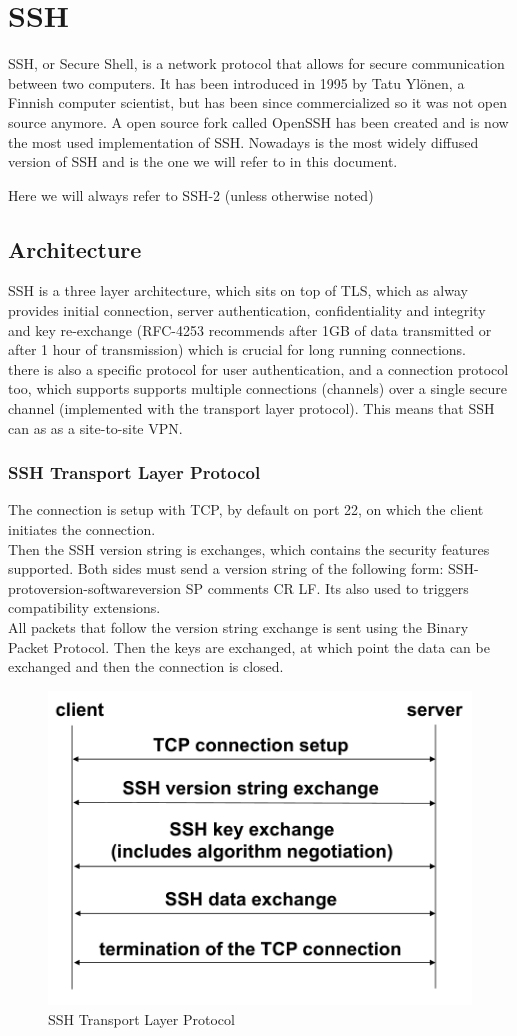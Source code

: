 \chapter{SSH}
SSH, or Secure Shell, is a network protocol that allows for secure
communication between two computers. It has been introduced in 1995 by
Tatu Ylönen, a Finnish computer scientist, but has been since
commercialized so it was not open source anymore. A open source fork 
called OpenSSH has been created and is now the most used
implementation of SSH. Nowadays is the most widely diffused version of 
SSH and is the one we will refer to in this document.

\begin{boxH}
  Here we will always refer to SSH-2 (unless otherwise noted)
\end{boxH}

\section{Architecture}
SSH is a three layer architecture, which sits on top of TLS, which as
alway provides initial connection, server authentication,
confidentiality and integrity and key re-exchange (RFC-4253 recommends
after 1GB of data transmitted or after 1 hour of transmission) which
is crucial for long running connections.\\
there is also a specific protocol for user authentication, and a
connection protocol too, which supports supports multiple connections
(channels) over a single secure channel (implemented with the
transport layer protocol). This means that SSH can as as a
site-to-site VPN.
\subsection{SSH Transport Layer Protocol}
The connection is setup with TCP, by default on port 22, on which the
client initiates the connection.\\
Then the SSH version string is exchanges, which contains the security
features supported. Both sides must send a version string of the
following form: SSH-protoversion-softwareversion SP comments CR LF.
Its also used to triggers compatibility extensions.\\
All packets that follow the version string exchange is sent using the
Binary Packet Protocol. Then the keys are exchanged, at which point
the data can be exchanged and then the connection is closed.
\begin{figure}[H]
  \centering
  \includegraphics[width=.6\textwidth]{img/SSH layer protocol.png}
  \caption{SSH Transport Layer Protocol}
\end{figure}
